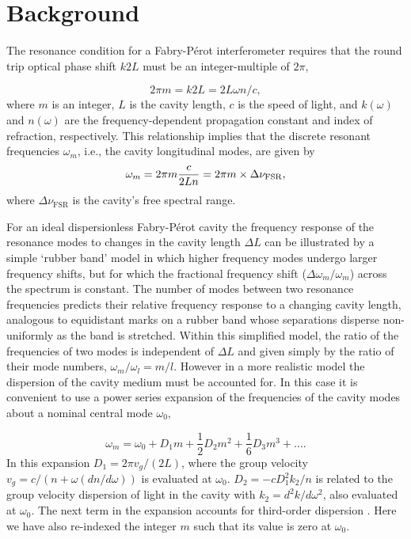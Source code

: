 \documentclass[10pt]{article}
\newcommand{\fabper}{Fabry-P{\'e}rot}
\begin{document}
\section{Background}
The resonance condition for a {\fabper} interferometer requires that the round trip optical phase shift $k2L$ must be an integer-multiple of $2\pi$,

\begin{equation} 
   2\pi m  = k2L = 2L\omega n/c,
 \end{equation}
where $m$ is an integer, $L$ is the cavity length, $c$ is the speed of light, and $k(\omega)$ and $n(\omega)$ are the frequency-dependent propagation constant and index of refraction, respectively.  This relationship implies that the discrete resonant frequencies $\omega_m$, i.e., the cavity longitudinal modes, are given by 
\begin{equation} 
   \omega_m  = 2\pi m \frac{c} {2Ln} = 2\pi m \times {\Delta}{\nu}_{\rm{FSR}},
 \end{equation}
 where ${\Delta}{\nu}_{\mathrm{FSR}}$ is the cavity's free spectral range.
 
For an ideal dispersionless {\fabper} cavity the frequency response of the resonance modes to changes in the cavity length $\Delta L$ can be illustrated by a simple \lq{}rubber band\rq{} model in which higher frequency modes undergo larger frequency shifts, but for which the fractional frequency shift ($\Delta\omega_m / {\omega_m}$) across the spectrum is constant. The number of modes between two resonance frequencies predicts their relative frequency response to a changing cavity length, analogous to equidistant marks on a rubber band whose separations disperse non-uniformly as the band is stretched. Within this simplified model, the ratio of the frequencies of two modes is independent of $\Delta L$ and given simply by the ratio of their mode numbers, $\omega_m/\omega_l=m/l$. However in a more realistic model the dispersion of the cavity medium must be accounted for.  In this case it is convenient to use a power series expansion of the frequencies of the cavity modes about a nominal central mode $\omega_0$,
 
\begin{equation} 
   \label{eqn:dispersion}
   \omega_m = \omega_0 + D_1m + \frac{1}{2}D_2m^2 + \frac{1}{6}D_3m^3 + ....
 \end{equation}
In this expansion $D_1=2\pi v_g/(2L)$, where the group velocity $v_g=c/(n+\omega(dn/d\omega))$ is evaluated at $\omega_0$. $D_2=-cD_1^2k_2/n$ is related to the group velocity dispersion of light in the cavity with $k_2=d^2k/d\omega^2$, also evaluated at $\omega_0$.  The next term in the expansion accounts for third-order dispersion \cite{Herr:2014}. Here we have also re-indexed the integer $m$ such that its value is zero at $\omega_0$.
\end{document}
